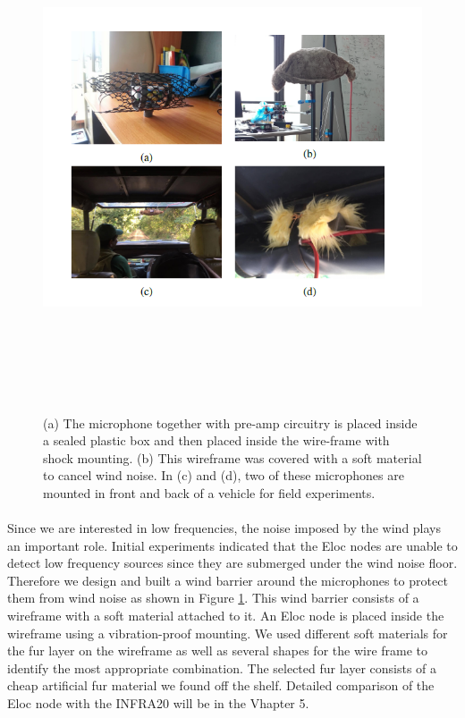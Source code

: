 \documentclass[12pt]{article}
\numberwithin{figure}{section}
\numberwithin{table}{section}
\begin{document}
\begin{figure}[H]
\centering
\includegraphics[width=12cm,height=15cm,keepaspectratio]{eloc_implementation.png}
\caption[Implementation of an Elocate node]{(a) The microphone together with pre-amp circuitry
is placed inside a sealed plastic box and then placed
inside the wire-frame with shock mounting. (b) This wireframe
was covered with a soft material to cancel wind noise.
In (c) and (d), two of these microphones are mounted in
front and back of a vehicle for field experiments.}
\label{figure:eloc}
\end{figure}

\paragraph{}
Since we are interested in low frequencies, the noise imposed by the wind plays an important role. Initial experiments indicated that the Eloc nodes are unable to detect low frequency sources since they are submerged under the wind noise floor. Therefore we design and built a wind barrier around the microphones to protect them from wind noise as shown in Figure \ref{figure:eloc}. This wind barrier consists of a wireframe with a soft material attached to it. An Eloc node is placed inside the wireframe using a vibration-proof mounting. We used different soft materials for the fur layer on the wireframe as well as several shapes for the wire frame to identify the most appropriate combination. The selected fur layer consists of a cheap artificial fur material we found off the shelf. Detailed comparison of the Eloc node with the INFRA20 will be in the Vhapter 5.
\end{document}
